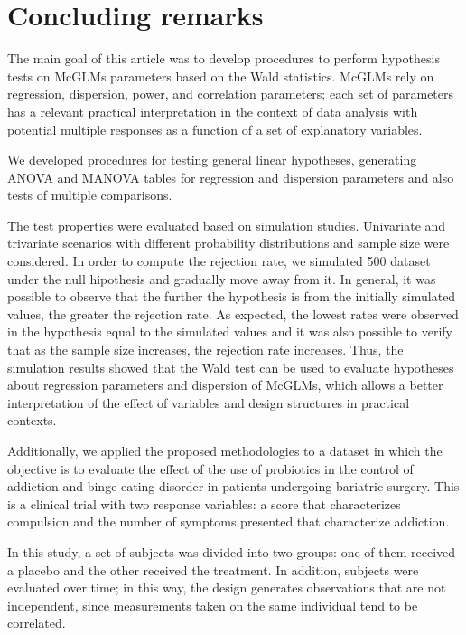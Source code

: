 \documentclass[USenglish]{article}
\theoremstyle{dgthm}
\theoremstyle{dgdef}
\begin{document}

\section{Concluding remarks}\label{sec7}

The main goal of this article was to develop procedures to perform hypothesis tests on McGLMs parameters based on the Wald statistics. McGLMs rely on regression, dispersion, power, and correlation parameters; each set of parameters has a relevant practical interpretation in the context of data analysis with potential multiple responses as a function of a set of explanatory variables.

We developed procedures for testing general linear hypotheses, generating ANOVA and MANOVA tables for regression and dispersion parameters and also tests of multiple comparisons.

The test properties were evaluated based on simulation studies. Univariate and trivariate scenarios with different probability distributions and sample size were considered.
In order to compute the rejection rate, we simulated 500 dataset under the null hipothesis and gradually move away from it. 
In general, it was possible to observe that the further the hypothesis is from the initially simulated values, the greater the rejection rate. 
As expected, the lowest rates were observed in the hypothesis equal to the simulated values and it was also possible to verify that as the sample size increases, 
the rejection rate increases. Thus, the simulation results showed that the Wald test can be used to evaluate hypotheses about regression parameters and dispersion of McGLMs, 
which allows a better interpretation of the effect of variables and design structures in practical contexts.

Additionally, we applied the proposed methodologies to a dataset in which the objective is to evaluate the effect of the use of probiotics in the control of addiction and binge eating 
disorder in patients undergoing bariatric surgery. This is a clinical trial with two response variables: a score that characterizes compulsion and the number of symptoms presented that characterize addiction.

In this study, a set of subjects was divided into two groups: one of them received a placebo and the other received the treatment. 
In addition, subjects were evaluated over time; in this way, the design generates observations that are not independent, since measurements taken on the same individual tend to be correlated.
\end{document}
